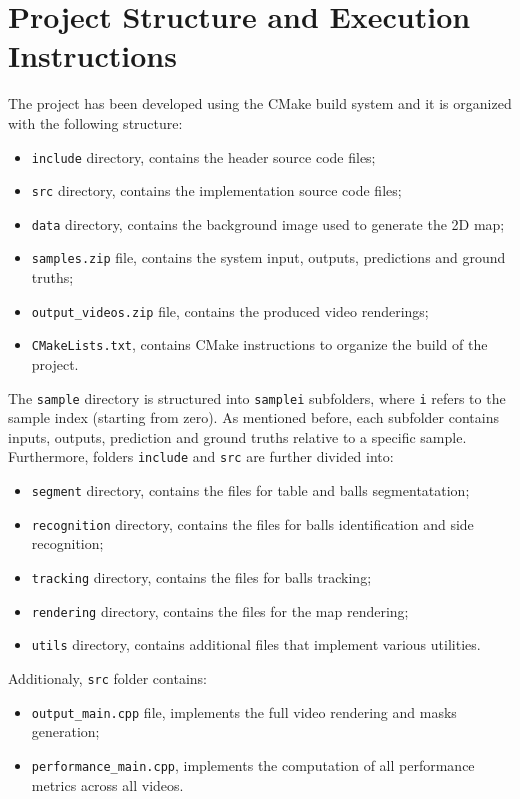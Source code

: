 \section{Project Structure and Execution Instructions}


The project has been developed using the CMake build system and it is organized with the
following structure:
\begin{itemize}
    \item \verb|include| directory, contains the header source code files;
    \item \verb|src| directory, contains the implementation source code files;
    \item \verb|data| directory, contains the background image used to generate the 2D map;
    \item \verb|samples.zip| file, contains the system input, outputs, predictions and ground truths;
    \item \verb|output_videos.zip| file, contains the produced video renderings;
    \item \verb|CMakeLists.txt|, contains CMake instructions to organize the build of the project. 
\end{itemize}

\noindent
The \verb|sample| directory is structured into \verb|samplei| subfolders, where \verb|i| refers to the sample index (starting from zero).
As mentioned before, each subfolder contains inputs, outputs, prediction and ground truths relative to a specific sample.
\\
\noindent
Furthermore, folders \verb|include| and \verb|src| are further divided into:
\begin{itemize}
    \item \verb|segment| directory, contains the files for table and balls segmentatation;
    \item \verb|recognition| directory, contains the files for balls identification and side recognition;
    \item \verb|tracking| directory, contains the files for balls tracking;
    \item \verb|rendering| directory, contains the files for the map rendering;
    \item \verb|utils| directory, contains additional files that implement various utilities.
\end{itemize}

\noindent
Additionaly, \verb|src| folder contains:
\begin{itemize}
    \item \verb|output_main.cpp| file, implements the full video rendering and masks generation;
    \item \verb|performance_main.cpp|, implements the computation of all performance metrics across all videos.
\end{itemize}

